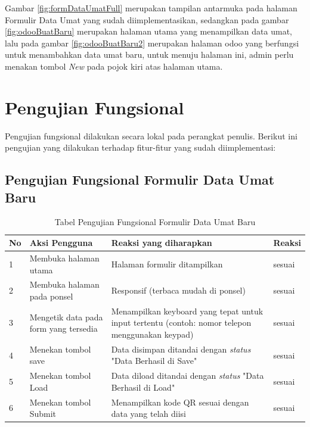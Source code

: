 Gambar \ref{fig:formDataUmatFull} merupakan tampilan antarmuka pada halaman Formulir Data Umat yang sudah diimplementasikan, sedangkan pada gambar \ref{fig:odooBuatBaru} merupakan halaman utama yang menampilkan data umat, lalu pada gambar \ref{fig:odooBuatBaru2} merupakan halaman odoo yang berfungsi untuk menambahkan data umat baru, untuk menuju halaman ini, admin perlu menakan tombol \textit{New} pada pojok kiri atas halaman utama.

\section{Pengujian Fungsional}
\label{sec:pengujianFungsional}

Pengujian fungsional dilakukan secara lokal pada perangkat penulis. Berikut ini pengujian yang dilakukan terhadap fitur-fitur yang sudah diimplementasi:

\subsection{Pengujian Fungsional Formulir Data Umat Baru}
\label{sec:pengujianFungsionalFormulir}

\begin{table}[H]
	\centering
	\caption{Tabel Pengujian Fungsional Formulir Data Umat Baru}
	\begin{tabular}{|p{0.5cm}| p{5cm}| p{6cm}| p{2.5cm}|} \hline
		No	&	Aksi Pengguna	&	Reaksi yang diharapkan	&	Reaksi \\ \hline
		1 	&  Membuka halaman utama & Halaman formulir ditampilkan &	sesuai	\\ \hline
		2 	&  Membuka halaman pada ponsel & Responsif (terbaca mudah di ponsel) &	sesuai	\\ \hline
		3 	&  Mengetik data pada form yang tersedia & Menampilkan keyboard yang tepat untuk input tertentu (contoh: nomor telepon menggunakan keypad) &	sesuai	\\ \hline
		4 	&  Menekan tombol save & Data disimpan ditandai dengan \textit{status} "Data Berhasil di Save" &	sesuai	\\ \hline
		5 	&  Menekan tombol Load & Data diload ditandai dengan \textit{status} "Data Berhasil di Load" &	sesuai	\\ \hline
		6 	&  Menekan tombol Submit & Menampilkan kode QR sesuai dengan data yang telah diisi &	sesuai	\\ \hline
	\end{tabular}
	\label{table:fungsionalFormulir}
\end{table}

